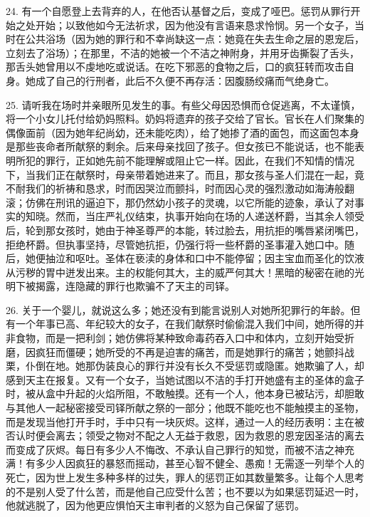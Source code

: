 24. 有一个自愿登上去背弃的人，在他否认基督之后，变成了哑巴。惩罚从罪行开始之处开始；以致他如今无法祈求，因为他没有言语来恳求怜悯。另一个女子，当时在公共浴场（因为她的罪行和不幸尚缺这一点：她竟在失去生命之层的恩宠后，立刻去了浴场）；在那里，不洁的她被一个不洁之神附身，并用牙齿撕裂了舌头，那舌头她曾用以不虔地吃或说话。在吃下邪恶的食物之后，口的疯狂转而攻击自身。她成了自己的行刑者，此后不久便不再存活：因腹肠绞痛而气绝身亡。\par

25. 请听我在场时并亲眼所见发生的事。有些父母因恐惧而仓促逃离，不太谨慎，将一个小女儿托付给奶妈照料。奶妈将遗弃的孩子交给了官长。官长在人们聚集的偶像面前（因为她年纪尚幼，还未能吃肉），给了她掺了酒的面包，而这面包本身是那些丧命者所献祭的剩余。后来母亲找回了孩子。但女孩已不能说话，也不能表明所犯的罪行，正如她先前不能理解或阻止它一样。因此，在我们不知情的情况下，当我们正在献祭时，母亲带着她进来了。而且，那女孩与圣人们混在一起，竟不耐我们的祈祷和恳求，时而因哭泣而颤抖，时而因心灵的强烈激动如海涛般翻滚；仿佛在刑讯的逼迫下，那仍然幼小孩子的灵魂，以它所能的迹象，承认了对事实的知晓。然而，当庄严礼仪结束，执事开始向在场的人递送杯爵，当其余人领受后，轮到那女孩时，她由于神圣尊严的本能，转过脸去，用抗拒的嘴唇紧闭嘴巴，拒绝杯爵。但执事坚持，尽管她抗拒，仍强行将一些杯爵的圣事灌入她口中。随后，她便抽泣和呕吐。圣体在亵渎的身体和口中不能停留；因主宝血而圣化的饮液从污秽的胃中迸发出来。主的权能何其大，主的威严何其大！黑暗的秘密在祂的光明下被揭露，连隐藏的罪行也欺骗不了天主的司铎。\par

26. 关于一个婴儿，就说这么多；她还没有到能言说别人对她所犯罪行的年龄。但有一个年事已高、年纪较大的女子，在我们献祭时偷偷混入我们中间，她所得的并非食物，而是一把利剑；她仿佛将某种致命毒药吞入口中和体内，立刻开始受折磨，因疯狂而僵硬；她所受的不再是迫害的痛苦，而是她罪行的痛苦；她颤抖战栗，仆倒在地。她那伪装良心的罪行并没有长久不受惩罚或隐匿。她欺骗了人，却感到天主在报复。又有一个女子，当她试图以不洁的手打开她盛有主的圣体的盒子时，被从盒中升起的火焰所阻，不敢触摸。还有一个人，他本身已被玷污，却胆敢与其他人一起秘密接受司铎所献之祭的一部分；他既不能吃也不能触摸主的圣物，而是发现当他打开手时，手中只有一块灰烬。这样，通过一人的经历表明：主在被否认时便会离去；领受之物对不配之人无益于救恩，因为救恩的恩宠因圣洁的离去而变成了灰烬。每日有多少人不悔改、不承认自己罪行的知觉，而被不洁之神充满！有多少人因疯狂的暴怒而摇动，甚至心智不健全、愚痴！无需逐一列举个人的死亡，因为世上发生多种多样的过失，罪人的惩罚正如其数量繁多。让每个人思考的不是别人受了什么苦，而是他自己应受什么苦；也不要以为如果惩罚延迟一时，他就逃脱了，因为他更应惧怕天主审判者的义怒为自己保留了惩罚。\par

